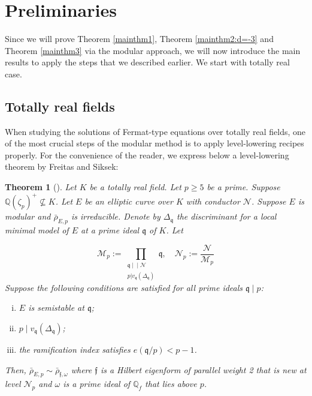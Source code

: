 \documentclass[]{article}
\newtheorem{theorem}{Theorem}
\newcommand{\pdiv}{\mid\!\mid}
\begin{document}
\section{Preliminaries}\label{section:preliminaries}

Since we will prove Theorem \ref{mainthm1}, Theorem \ref{mainthm2:d=-3} and Theorem \ref{mainthm3} via the modular approach, we will now introduce the main results to apply the steps that we described earlier. We start with totally real case.

\subsection{Totally real fields}


When studying the solutions of Fermat-type equations over totally real fields, one of the most crucial steps of the modular method is to apply level-lowering recipes properly. For the convenience of the reader, we express below a level-lowering theorem by Freitas and Siksek:

\begin{theorem}[{\cite[Theorem 7]{freitas2015asymptotic}}]\label{levellow}
Let $K$ be a totally real field. Let $p \geq 5$ be a prime. Suppose $\mathbb{Q}\left(\zeta_p\right)^{+} \nsubseteq K$. Let $E$ be an elliptic curve over $K$ with conductor $\mathcal{N}$. Suppose $E$ is modular and $\bar{\rho}_{E, p}$ is irreducible. Denote by $\Delta_{\mathfrak{q}}$ the discriminant for a local minimal model of $E$ at a prime ideal $\mathfrak{q}$ of $K$. Let

$$
\mathcal{M}_p:=\prod_{\substack{\mathfrak{q}\pdiv \mathcal{N}\\ p| v_{\mathfrak{q}}\left(\Delta_{\mathfrak{q}}\right)}} \mathfrak{q}, \quad \mathcal{N}_p:=\frac{\mathcal{N}}{\mathcal{M}_p}
$$Suppose the following conditions are satisfied for all prime ideals $\mathfrak{q} \mid p$:
\begin{enumerate}[(i)]
\item $E$ is semistable at $\mathfrak{q}$;
\item\label{item:ii-levellowering} $p \mid v_\mathfrak{q}\left(\Delta_\mathfrak{q}\right)$;
\item the ramification index satisfies $e(\mathfrak{q} / p)<p-1$.
\end{enumerate}

Then, $\bar{\rho}_{E, p} \sim \bar{\rho}_{\mathfrak{f}, \omega}$ where $\mathfrak{f}$ is a Hilbert eigenform of parallel weight 2 that is new at level $\mathcal{N}_p$ and $\omega$ is a prime ideal of $\mathbb{Q}_f$ that lies above $p$.
\end{theorem}
\end{document}
